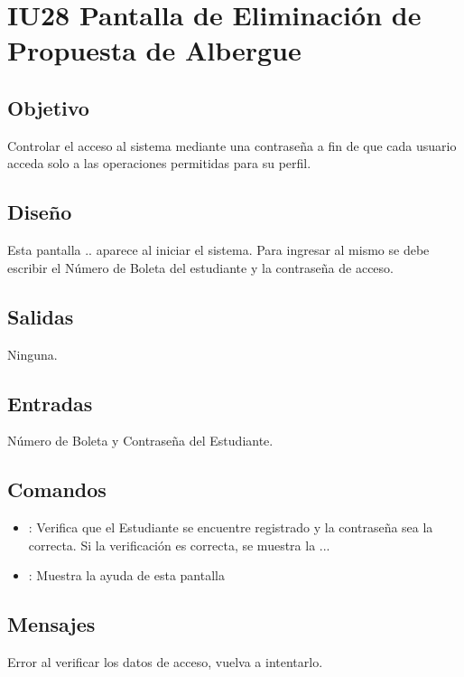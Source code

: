 \section{IU28 Pantalla de Eliminación de Propuesta de Albergue}

\subsection{Objetivo}
	Controlar el acceso al sistema mediante una contraseña a fin de que cada usuario acceda solo a las operaciones permitidas para su perfil.

\subsection{Diseño}
	Esta pantalla .. aparece al iniciar el sistema. Para ingresar al mismo se debe escribir el Número de Boleta del estudiante y la contraseña de acceso. 

\subsection{Salidas}

	Ninguna.

\subsection{Entradas}
Número de Boleta y Contraseña del Estudiante.

\subsection{Comandos}
\begin{itemize}
	\item {}: Verifica que el Estudiante se encuentre registrado y la contraseña sea la correcta. Si la verificación es correcta, se muestra la ...
	\item {}: Muestra la ayuda de esta pantalla %
\end{itemize}

\subsection{Mensajes}

\begin{Citemize}
	\item Error al verificar los datos de acceso, vuelva a intentarlo.
\end{Citemize}

\clearpage